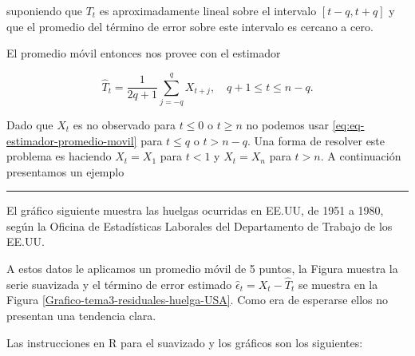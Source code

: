 \documentclass[12pt,]{krantz}
\theoremstyle{definition}
\theoremstyle{definition}
\theoremstyle{definition}
\theoremstyle{remark}
\let\BeginKnitrBlock\begin \let\EndKnitrBlock\end
\begin{document}
suponiendo que \(T_t\) es aproximadamente lineal sobre el intervalo
\([t-q,t+q]\) y que el promedio del término de error sobre este
intervalo es cercano a cero.

El promedio móvil entonces nos provee con el estimador

\begin{equation}
\hat{T}_t = \frac{1}{2q+1}\sum_{j=-q}^qX_{t+j},\quad q+1\leq t\leq n-q.
\label{eq:eq-estimador-promedio-movil}
\end{equation}

Dado que \(X_t\) es no observado para \(t\leq0\) o \(t\geq n\) no
podemos usar \eqref{eq:eq-estimador-promedio-movil} para \(t\leq q\) o
\(t>n-q\). Una forma de resolver este problema es haciendo \(X_t=X_1\)
para \(t<1\) y \(X_t=X_n\) para \(t>n\). A continuación presentamos un
ejemplo

\begin{center}\rule{0.5\linewidth}{\linethickness}\end{center}

\BeginKnitrBlock{example}
\protect\hypertarget{exm:ejem-huelgas-USA-T2}{}{\label{exm:ejem-huelgas-USA-T2}
}El gráfico siguiente muestra las huelgas ocurridas en EE.UU, de 1951 a
1980, según la Oficina de Estadísticas Laborales del Departamento de
Trabajo de los EE.UU.
\EndKnitrBlock{example}

A estos datos le aplicamos un promedio móvil de 5 puntos, la Figura
muestra la serie suavizada y el término de error estimado
\(\hat{\epsilon}_t = X_t - \hat{T}_t\) se muestra en la Figura
\ref{Grafico-tema3-residuales-huelga-USA}. Como era de esperarse ellos
no presentan una tendencia clara.

Las instrucciones en R para el suavizado y los gráficos son los
siguientes:
\end{document}
